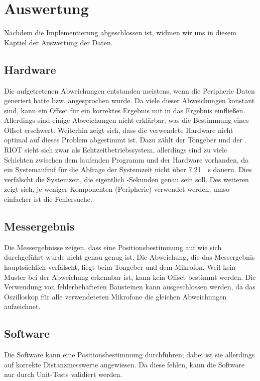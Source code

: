 \newpage
\section{Auswertung}

Nachdem die Implementierung abgeschlossen ist, widmen wir uns in diesem Kaptiel der Auswertung der Daten.

\subsection{Hardware}
Die aufgetretenen Abweichungen entstanden meistens, wenn die Peripherie Daten generiert hatte bzw. angesprochen wurde. Da viele dieser Abweichungen konstant sind, kann ein Offset für ein korrektes Ergebnis mit in das Ergebnis einfließen. Allerdings sind einige Abweichungen nicht erklärbar, was die Bestimmung eines Offset erschwert. Weiterhin zeigt sich, dass die verwendete Hardware nicht optimal auf dieses Problem abgestimmt ist. Dazu zählt der Tongeber und der \microphone . RIOT sieht sich zwar als Echtzeitbetriebssystem, allerdings sind zu viele Schichten zwischen dem laufenden Programm und der Hardware vorhanden, da ein Systemaufruf für die Abfrage der Systemzeit nicht über \SI{7,21}{\mu s} dauern. Dies verfälscht die Systemzeit, die eigentlich \si{\mu}-Sekunden genau sein soll. Des weiteren zeigt sich, je weniger Komponenten (Peripherie) verwendet werden, umso einfacher ist die Fehlersuche.

\subsection{Messergebnis}
Die Messergebnisse zeigen, dass eine Positionsbestimmung auf wie sich durchgeführt wurde nicht genau genug ist. Die Abweichung, die das Messergebnis hauptsächlich verfälscht, liegt beim Tongeber und dem Mikrofon. Weil kein Muster bei der Abweichung erkennbar ist, kann kein Offset bestimmt werden. Die Verwendung von fehlerbehafteten Bausteinen kann ausgeschlossen werden, da das Oszilloskop für alle verwendeteten Mikrofone die gleichen Abweichungen aufzeichnet.

\subsection{Software}

Die Software kann eine Positionsbestimmung durchführen; dabei ist sie allerdings auf korrekte Distanzmesswerte angewiesen. Da diese fehlen, kann die Software nur durch Unit-Tests validiert werden.
